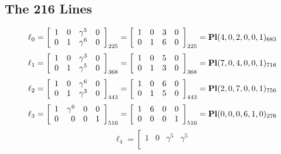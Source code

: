 \documentclass{article}
\begin{document}
{\subsection*{The 216 Lines}
$$
\ell_{0} = 
\left[
\begin{array}{*{4}{r}}
1 & 0 & \gamma^{5} & 0\\
0 & 1 & \gamma^{6} & 0\\
\end{array}
\right]
_{225}
=
\left[
\begin{array}{*{4}c}
1  & 0  & 3  & 0\\
0  & 1  & 6  & 0\\
\end{array}
\right]_{225}
={\rm\bf Pl}(4,0,2,0,0,1 )_{683}$$
$$
\ell_{1} = 
\left[
\begin{array}{*{4}{r}}
1 & 0 & \gamma^{3} & 0\\
0 & 1 & \gamma^{5} & 0\\
\end{array}
\right]
_{368}
=
\left[
\begin{array}{*{4}c}
1  & 0  & 5  & 0\\
0  & 1  & 3  & 0\\
\end{array}
\right]_{368}
={\rm\bf Pl}(7,0,4,0,0,1 )_{716}$$
$$
\ell_{2} = 
\left[
\begin{array}{*{4}{r}}
1 & 0 & \gamma^{6} & 0\\
0 & 1 & \gamma^{3} & 0\\
\end{array}
\right]
_{443}
=
\left[
\begin{array}{*{4}c}
1  & 0  & 6  & 0\\
0  & 1  & 5  & 0\\
\end{array}
\right]_{443}
={\rm\bf Pl}(2,0,7,0,0,1 )_{756}$$
$$
\ell_{3} = 
\left[
\begin{array}{*{4}{r}}
1 & \gamma^{6} & 0 & 0\\
0 & 0 & 0 & 1\\
\end{array}
\right]
_{510}
=
\left[
\begin{array}{*{4}c}
1  & 6  & 0  & 0\\
0  & 0  & 0  & 1\\
\end{array}
\right]_{510}
={\rm\bf Pl}(0,0,0,6,1,0 )_{276}$$
$$
\ell_{4} = 
\left[
\begin{array}{*{4}{r}}
1 & 0 & \gamma^{5} & \gamma^{5}\\

\end{array}$$}
\end{document}
